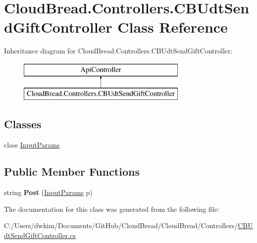 \hypertarget{a00063}{}\section{Cloud\+Bread.\+Controllers.\+C\+B\+Udt\+Send\+Gift\+Controller Class Reference}
\label{a00063}
Inheritance diagram for Cloud\+Bread.\+Controllers.\+C\+B\+Udt\+Send\+Gift\+Controller\+:\begin{figure}[H]
\begin{center}
\leavevmode
\includegraphics[height=2.000000cm]{a00063}
\end{center}
\end{figure}
\subsection*{Classes}
\begin{DoxyCompactItemize}
\item 
class \hyperlink{a00116}{Input\+Params}
\end{DoxyCompactItemize}
\subsection*{Public Member Functions}
\begin{DoxyCompactItemize}
\item 
string {\bfseries Post} (\hyperlink{a00116}{Input\+Params} p)\hypertarget{a00063_a4076720fd05860f0eec62024465afdb3}{}\label{a00063_a4076720fd05860f0eec62024465afdb3}

\end{DoxyCompactItemize}


The documentation for this class was generated from the following file\+:\begin{DoxyCompactItemize}
\item 
C\+:/\+Users/dwkim/\+Documents/\+Git\+Hub/\+Cloud\+Bread/\+Cloud\+Bread/\+Controllers/\hyperlink{a00233}{C\+B\+Udt\+Send\+Gift\+Controller.\+cs}\end{DoxyCompactItemize}
